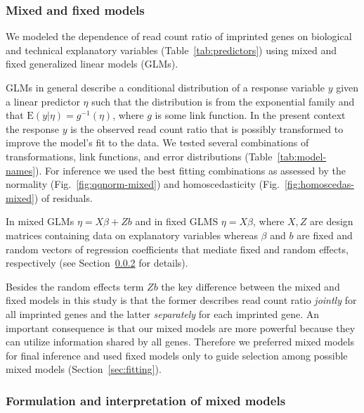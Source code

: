\documentclass[letterpaper]{article}
\begin{document}
\subsubsection{Mixed and fixed models}

We modeled the dependence of read count ratio of imprinted genes on biological
and technical explanatory variables (Table~\ref{tab:predictors}) using mixed
and fixed generalized linear models (GLMs).

GLMs in general describe a conditional distribution of a response variable
\(y\) given a linear predictor \(\eta\) such that the distribution is from the
exponential family and that \(\mathrm{E}(y|\eta) = g^{-1} (\eta)\), where
\(g\) is some link function.  In the present context the response \(y\) is the
observed read count ratio that is possibly transformed to improve the model's
fit to the data.  We tested several combinations of transformations, link
functions, and error distributions (Table~\ref{tab:model-names}).  For
inference we used the best fitting combinations as assessed by the normality
(Fig.~\ref{fig:qqnorm-mixed}) and homoscedasticity
(Fig.~\ref{fig:homoscedas-mixed}) of residuals.

In mixed GLMs \(\eta = X
\beta + Z b\) and in fixed GLMS \(\eta = X \beta\), where \(X, Z\) are design
matrices containing data on explanatory variables whereas \(\beta \) and \(b\)
are fixed and random vectors of regression coefficients that mediate fixed and
random effects, respectively (see Section~\ref{sec:mixed-mod} for 
details).

Besides the random effects term \(Zb\) the key difference between
the mixed and fixed models in this study is that the former describes
read count ratio \emph{jointly} for all imprinted genes and the latter
\emph{separately} for each imprinted gene.  An important consequence is that
our mixed models are more powerful because they can utilize 
information shared by all genes.  Therefore we preferred mixed models for final
inference and used fixed models only to guide selection among possible mixed
models (Section~\ref{sec:fitting}).

\subsubsection{Formulation and interpretation of mixed models}
\label{sec:mixed-mod}
\end{document}
